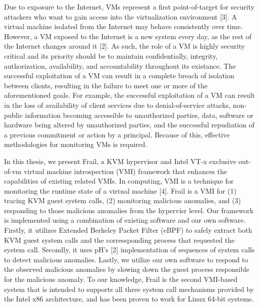 \documentclass{report}
\begin{document}
\begin{spacing}{1.5}
{\large 
Due to exposure to the Internet, VMs represent a first point-of-target for security attackers who want to gain access into the virtualization environment [3]. A virtual machine isolated from the Internet may behave consistently over time. However, a VM exposed to the Internet is a new system every day, as the rest of the Internet changes around it [2]. As such, the role of a VM is highly security critical and its priority should be to maintain confidentially, integrity, authorization, availability, and accountability throughout its existance. The successful exploitation of a VM can result in a complete breach of isolation between clients, resulting in the failure to meet one or more of the aforementioned goals. For example, the successful exploitation of a VM can result in the loss of availability of client services due to denial-of-service attacks, non-public information becoming accessible to unauthorized parties, data, software or hardware being altered by unauthorized parties, and the successful repudiation of a previous commitment or action by a principal. Because of this, effective methodologies for monitoring VMs is required.
\newline
}

{\large 
In this thesis, we present Frail, a KVM hypervisor and Intel VT-x exclusive out-of-vm virtual machine introspection (VMI) framework that enhances the capabilities of existing related VMIs. In computing, VMI is a technique for monitoring the runtime state of a virtual machine [4]. Frail is a VMI for (1) tracing KVM guest system calls, (2) monitoring malicious anomalies, and (3) responding to those malicious anomalies from the hypervisr level. Our framework is implemented using a combination of existing software and our own software. Firstly, it utilizes Extended Berkeley Packet Filter (eBPF) to safely extract both KVM guest system calls and the corressponding process that requested the system call. Secondly, it uses pH's [2] implementation of sequences of system calls to detect malicious anomalies. Lastly, we utilize our own software to respond to the observed malicious anomalies by slowing down the guest process responsible for the malicious anomaly. To our knowledge, Frail is the second VMI-based system that is intended to supports all three system call mechanisms provided by the Intel x86 architecture, and has been proven to work for Linux 64-bit systems.
\newline
}






\end{spacing}
\end{document}
